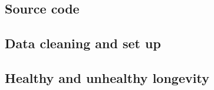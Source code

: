\documentclass[\main/main.tex]{subfiles}
\begin{document}
\begin{newpage}








\chapter{Source code}


\section{Data cleaning and set up}






\newpage

\section{Healthy and unhealthy longevity}






\end{newpage}
\end{document}
